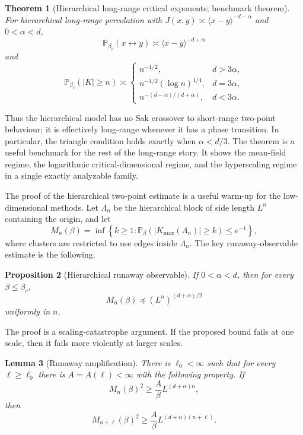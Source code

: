 \documentclass[11pt,reqno]{book}
\numberwithin{equation}{chapter}
\theoremstyle{plain}
\newtheorem{theorem}{Theorem}[chapter]
\newtheorem{lemma}[theorem]{Lemma}
\newtheorem{prop}[theorem]{Proposition}
\theoremstyle{definition}
\theoremstyle{remark}
\newcommand{\1}{\mathbf 1}
\newcommand{\pre}{\preceq}
\begin{document}
\begin{theorem}[Hierarchical long-range critical exponents; benchmark theorem]
For hierarchical long-range percolation with
\(J(x,y)\asymp\langle x-y\rangle^{-d-\alpha}\) and \(0<\alpha<d\),
\[
  \mathbb P_{\beta_c}(x\leftrightarrow y)
  \asymp
  \langle x-y\rangle^{-d+\alpha}
\]
and
\[
  \mathbb P_{\beta_c}(|K|\geq n)\asymp
  \begin{cases}
    n^{-1/2}, & d>3\alpha,\\
    n^{-1/2}(\log n)^{1/4}, & d=3\alpha,\\
    n^{-(d-\alpha)/(d+\alpha)}, & d<3\alpha.
  \end{cases}
\]
\end{theorem}

Thus the hierarchical model has no Sak crossover to short-range two-point
behaviour; it is effectively long-range whenever it has a phase transition.
In particular, the triangle condition holds exactly when \(\alpha<d/3\).
The theorem is a useful benchmark for the rest of the long-range story. It
shows the mean-field regime, the logarithmic critical-dimensional regime, and
the hyperscaling regime in a single exactly analyzable family.

The proof of the hierarchical two-point estimate is a useful warm-up for the
low-dimensional methods. Let \(\Lambda_n\) be the hierarchical block of side
length \(L^n\) containing the origin, and let
\[
  M_n(\beta)
  =
  \inf\left\{
  k\geq1:
  \mathbb P_\beta(|K_{\max}(\Lambda_n)|\geq k)\leq e^{-1}
  \right\},
\]
where clusters are restricted to use edges inside \(\Lambda_n\). The key
runaway-observable estimate is the following.

\begin{prop}[Hierarchical runaway observable]
If \(0<\alpha<d\), then for every \(\beta\leq\beta_c\),
\[
  M_n(\beta)\pre (L^n)^{(d+\alpha)/2}
\]
uniformly in \(n\).
\end{prop}

The proof is a scaling-catastrophe argument. If the proposed bound fails at
one scale, then it fails more violently at larger scales.

\begin{lemma}[Runaway amplification]
There is \(\ell_0<\infty\) such that for every \(\ell\geq\ell_0\) there is
\(A=A(\ell)<\infty\) with the following property. If
\[
  M_n(\beta)^2\geq \frac A\beta L^{(d+\alpha)n},
\]
then
\[
  M_{n+\ell}(\beta)^2
  \geq
  \frac A\beta L^{(d+\alpha)(n+\ell)} .
\]
\end{lemma}
\end{document}
